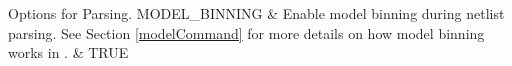 


\begin{OptionTable}{Options for Parsing.}
\label{parserPKG}
MODEL\_BINNING & Enable model binning during netlist parsing.  See 
Section \ref{modelCommand} for more details on how model binning 
works in \Xyce{}. & TRUE \\ \hline
\end{OptionTable}

